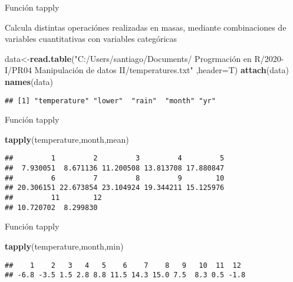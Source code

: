 \documentclass[ignorenonframetext,]{beamer}
\newenvironment{Shaded}{\begin{snugshade}}{\end{snugshade}}
\newcommand{\KeywordTok}[1]{\textcolor[rgb]{0.13,0.29,0.53}{\textbf{#1}}}
\newcommand{\DataTypeTok}[1]{\textcolor[rgb]{0.13,0.29,0.53}{#1}}
\newcommand{\StringTok}[1]{\textcolor[rgb]{0.31,0.60,0.02}{#1}}
\newcommand{\NormalTok}[1]{#1}
\begin{document}
\begin{frame}[fragile]{Función tapply}

Calcula distintas operaciónes realizadas en masas, mediante
combinaciones de variables cuantitativas con variables categóricas

\begin{Shaded}
\begin{Highlighting}[]
\NormalTok{data<-}\KeywordTok{read.table}\NormalTok{(}\StringTok{"C:/Users/santiago/Documents/}
	\StringTok{Progrmación en R/2020-I/PR04}
	\StringTok{Manipulación de datos II/temperatures.txt"}
	 \NormalTok{,}\DataTypeTok{header=}\NormalTok{T)}
\KeywordTok{attach}\NormalTok{(data)}
\KeywordTok{names}\NormalTok{(data)}
\end{Highlighting}
\end{Shaded}

\begin{verbatim}
## [1] "temperature" "lower"  "rain"  "month" "yr"
\end{verbatim}

\end{frame}

\begin{frame}[fragile]{Función tapply}

\begin{Shaded}
\begin{Highlighting}[]
\KeywordTok{tapply}\NormalTok{(temperature,month,mean)}
\end{Highlighting}
\end{Shaded}

\begin{verbatim}
##         1         2         3         4         5         
##  7.930051  8.671136 11.200508 13.813708 17.880847  
##         6         7         8         9        10
## 20.306151 22.673854 23.104924 19.344211 15.125976
##         11        12 
## 10.720702  8.299830
\end{verbatim}

\end{frame}



\begin{frame}[fragile]{Función tapply}

\begin{Shaded}
\begin{Highlighting}[]
\KeywordTok{tapply}\NormalTok{(temperature,month,min)}
\end{Highlighting}
\end{Shaded}

\begin{verbatim}
##    1    2   3   4   5    6    7    8   9   10  11  12 
## -6.8 -3.5 1.5 2.8 8.8 11.5 14.3 15.0 7.5  8.3 0.5 -1.8
\end{verbatim}


\end{frame}
\end{document}
